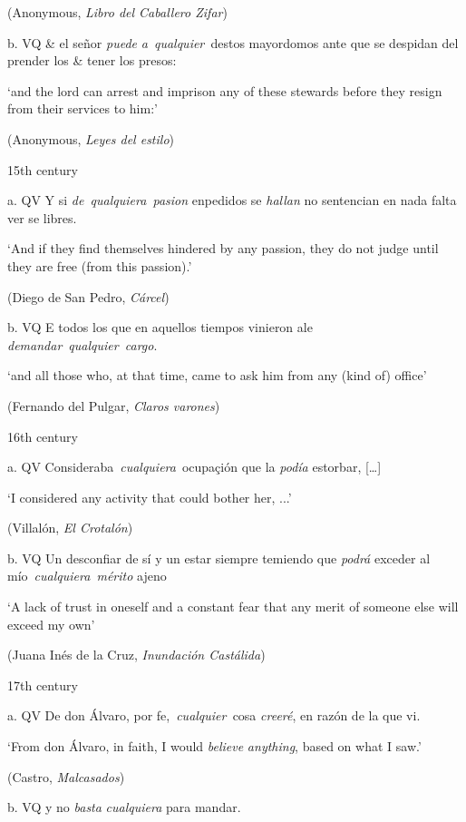       (Anonymous, \textit{Libro del Caballero Zifar})

  b.  VQ  \& el señor \textit{puede} \textit{a~qualquier~}destos mayordomos ante que se despidan del prender los \& tener los presos: 

      ‘and the lord can arrest and imprison any of these stewards before they resign from their services to him:’

      (Anonymous, \textit{Leyes del estilo})

  15th century

  a.  QV  Y si \textit{de~qualquiera~pasion} enpedidos se \textit{hallan} no sentencian en nada falta ver se libres. 

      ‘And if they find themselves hindered by any passion, they do not judge until they are free (from this passion).’

      (Diego de San Pedro, \textit{Cárcel})

  b.  VQ  E todos los que en aquellos tiempos vinieron ale \textit{demandar}~\textit{qualquier~cargo}. 

      ‘and all those who, at that time, came to ask him from any (kind of) office’

      (Fernando del Pulgar, \textit{Claros varones})

  16th century

  a.  QV  Consideraba~\textit{cualquiera}~ocupaçión que la \textit{podía} estorbar, […]

      ‘I considered any activity that could bother her, ...’

      (Villalón, \textit{El Crotalón})

  b.  VQ  Un desconfiar de sí y un estar siempre temiendo que \textit{podrá} exceder al mío~\textit{cualquiera~mérito} ajeno 

      ‘A lack of trust in oneself and a constant fear that any merit of someone else will exceed my own’

      (Juana Inés de la Cruz, \textit{Inundación Castálida})

  17th century

  a.  QV  De don Álvaro, por fe,~\textit{cualquier~}cosa \textit{creeré}, en razón de la que vi. 

      ‘From don Álvaro, in faith, I would \textit{believe} \textit{anything}, based on what I saw.’

      (Castro, \textit{Malcasados})

  b.  VQ  y no \textit{basta} \textit{cualquiera} para mandar. 

